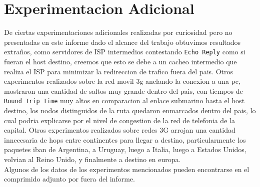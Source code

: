 \section{Experimentacion Adicional}
De ciertas experimentaciones adicionales realizadas por curiosidad pero no presentadas en este informe dado el alcance del trabajo obtuvimos resultados extraños, como servidores de ISP intermedios contestando \texttt{Echo Reply} como si fueran el host destino, creemos que esto se debe a un cacheo intermedio que realiza el ISP para minimizar la redireccion de trafico fuera del pais. Otros experimentos realizados sobre la red movil 3g anclando la conexion a una pc, mostraron una cantidad de saltos muy grande dentro del pais, con tiempos de \texttt{Round Trip Time} muy altos en comparacion al enlace submarino hasta el host destino, los nodos distinguidos de la ruta quedaron enmarcados dentro del pais, lo cual podria explicarse por el nivel de congestion de la red de telefonia de la capital. Otros experimentos realizados sobre redes 3G arrojan una cantidad innecesaria de hops entre continentes para llegar a destino, particularmente los paquetes iban de Argentina, a Uruguay, luego a Italia, luego a Estados Unidos, volvian al Reino Unido, y finalmente a destino en europa.\\
Algunos de los datos de los experimentos mencionados pueden encontrarse en el comprimido adjunto por fuera del informe.